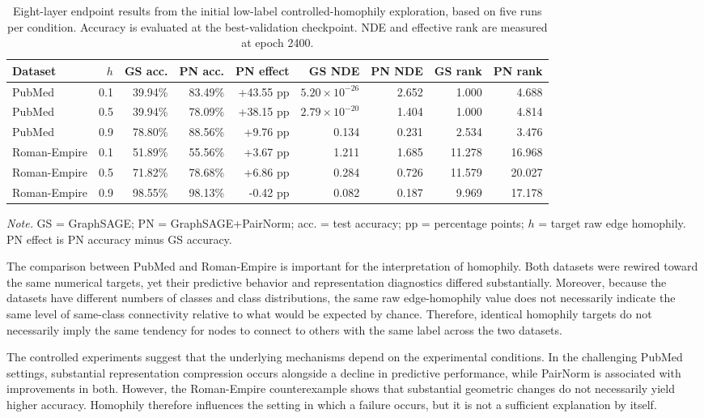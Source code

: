 \documentclass[english]{lni}
\begin{document}
\begin{landscape}
\begin{table}[p]
\centering
\caption{Eight-layer endpoint results from the initial low-label controlled-homophily exploration, based on five
runs per condition. Accuracy is evaluated at the best-validation checkpoint. NDE and effective rank are measured at epoch 2400.}
\label{tab:controlled-results}
\small
\begin{tabular}{lrrrrrrrr}
\toprule
Dataset & $h$ & GS acc. & PN acc. & PN effect &
GS NDE & PN NDE & GS rank & PN rank\\
\midrule
PubMed & 0.1 & 39.94\% & 83.49\% & +43.55 pp &
$5.20\times10^{-26}$ & 2.652 & 1.000 & 4.688\\
PubMed & 0.5 & 39.94\% & 78.09\% & +38.15 pp &
$2.79\times10^{-20}$ & 1.404 & 1.000 & 4.814\\
PubMed & 0.9 & 78.80\% & 88.56\% & +9.76 pp &
0.134 & 0.231 & 2.534 & 3.476\\
Roman-Empire & 0.1 & 51.89\% & 55.56\% & +3.67 pp &
1.211 & 1.685 & 11.278 & 16.968\\
Roman-Empire & 0.5 & 71.82\% & 78.68\% & +6.86 pp &
0.284 & 0.726 & 11.579 & 20.027\\
Roman-Empire & 0.9 & 98.55\% & 98.13\% & -0.42 pp &
0.082 & 0.187 & 9.969 & 17.178\\
\bottomrule
\end{tabular}

\smallskip
\parbox{\linewidth}{\footnotesize
\textit{Note.} GS = GraphSAGE; PN = GraphSAGE+PairNorm;
acc. = test accuracy; pp = percentage points;
$h$ = target raw edge homophily.
PN effect is PN accuracy minus GS accuracy.
}
\end{table}
\end{landscape}

The comparison between PubMed and Roman-Empire is important for the interpretation of homophily. Both datasets were rewired toward the same numerical targets, yet their predictive behavior and representation diagnostics differed substantially. Moreover, because the datasets have different numbers of classes and class distributions, the same raw edge-homophily value does not necessarily indicate the same level of same-class connectivity relative to what would be expected by chance. Therefore, identical homophily targets do not necessarily imply the same tendency for nodes to connect to others with the same label across the two datasets.

The controlled experiments suggest that the underlying mechanisms depend on the experimental conditions. In the challenging PubMed settings, substantial representation compression occurs alongside a decline in predictive performance, while PairNorm is associated with improvements in both. However, the Roman-Empire counterexample shows that substantial geometric changes do not necessarily yield higher accuracy. Homophily therefore influences the setting in which a failure occurs, but it is not a sufficient explanation by itself.
\end{document}
